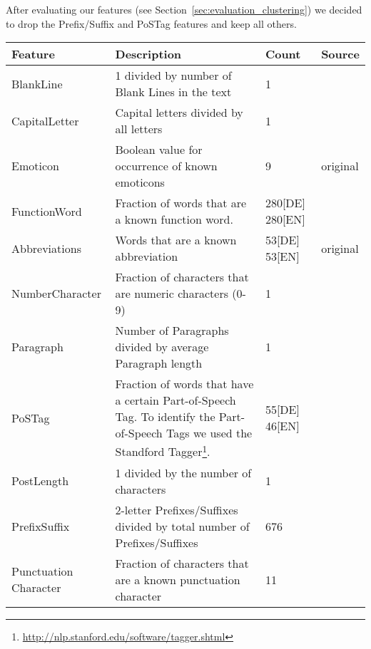 After evaluating our features (see Section~\ref{sec:evaluation_clustering}) we decided to drop the Prefix/Suffix and PoSTag features and keep all others.

\begin{table}[h]
    \begin{center}
    \begin{tabular}{p{2.6cm}|p{6cm}|p{1.2cm}|p{1.2cm}}
    Feature					& Description																& Count				& Source\\ \hline \hline
    BlankLine				& 1 divided by number of Blank Lines in the text							& 1					& \cite{de2001mining}\\ \hline
    CapitalLetter			& Capital letters divided by all letters									& 1					& \cite{argamon2003style} \cite{de2001mining}\\ \hline
    Emoticon				& Boolean value for occurrence of known emoticons							& 9					& original\\ \hline
    FunctionWord			& Fraction of words that are a known function word.							& 280[DE] 280[EN]	& \cite{argamon2003style} \cite{de2001mining} \cite{madigan2005author} \cite{narayanan2012feasibility}\\ \hline
    Abbreviations			& Words that are a known abbreviation										& 53[DE] 53[EN]		& original\\ \hline
    NumberCharacter			& Fraction of characters that are numeric characters (0-9)					& 1					& \cite{narayanan2012feasibility}\\ \hline
    Paragraph				& Number of Paragraphs divided by average Paragraph	length					& 1					& \cite{argamon2003style}\\ \hline
    PoSTag					& Fraction of words that have a certain Part-of-Speech Tag. To identify the Part-of-Speech Tags we used the Standford Tagger\footnote{\url{http://nlp.stanford.edu/software/tagger.shtml}}.
                                                                                                        & 55[DE] 46[EN]  	& \cite{madigan2005author}\\ \hline
    PostLength				& 1 divided by the number of characters										& 1					& \cite{narayanan2012feasibility}\\ \hline
    PrefixSuffix			& 2-letter Prefixes/Suffixes divided by total number of Prefixes/Suffixes	& 676 			 	& \cite{madigan2005author}\\ \hline
    Punctuation Character	& Fraction of characters that are a known punctuation character				& 11				& \cite{madigan2005author} \cite{narayanan2012feasibility}\\ \hline

\end{tabular}
\end{center}
\end{table}
